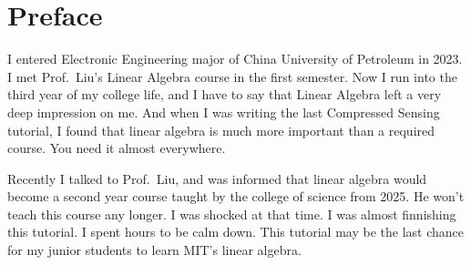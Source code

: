 \documentclass[12pt]{ctexart}
\begin{document}
\begin{titlepage}
    \centering
    \vspace*{96pt}
    \fontsize{26}{31.2}\selectfont{Retracing the Path of Linear Algebra}\par %
    \vspace{39pt}
    \fontsize{22}{26.4}\selectfont{\haettenfont v1 .0\normalfont}\par %
    \vspace{52.8pt}
    \fontsize{18}{21.6}\par %
    \fontsize{18}{21.6}\selectfont{Last Edited on: Sept 3rd, 2025}\par %
    \vfill
\end{titlepage}

\newpage
\thispagestyle{empty}
\small
\tableofcontents
\newpage
\setcounter{page}{1}

\fancyhf{}
\fancyhead[C]{ }
\fancyfoot[C]{\bfseries\thepage}

\newpage
\titleformat{\section}[block]{\normalfont\Large\bfseries\centering}{}{0pt}{}
\section*{\textbf{Preface}}

I entered Electronic Engineering major of China University of Petroleum in 2023. I met
Prof.\ Liu's Linear Algebra course in the first semester. Now I run into the third year of my
college life, and I have to say that Linear Algebra left a very deep impression on me. And
when I was writing the last Compressed Sensing tutorial, I found that linear algebra is
much more important than a required course. You need it almost everywhere.

Recently I talked to Prof.\ Liu, and was informed that linear algebra would become a second
year course taught by the college of science from 2025. He won't teach this course any longer.
I was shocked at that time. I was almost finnishing this tutorial. I spent hours to be calm
down. This tutorial may be the last chance for my junior students to learn MIT's linear algebra.
\end{document}
